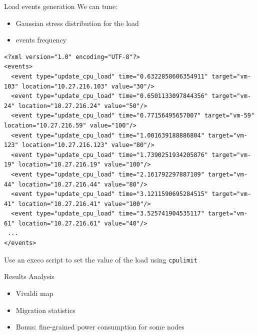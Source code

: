 \documentclass{beamer}
\begin{document}
\begin{frame}[fragile]{Load events generation}
We can tune:
\begin{itemize}
    \item Gaussian stress distribution for the load
    \item events frequency
\end{itemize}
\tiny
\begin{verbatim}
<?xml version="1.0" encoding="UTF-8"?>
<events>
  <event type="update_cpu_load" time="0.6322858606354911" target="vm-103" location="10.27.216.103" value="30"/>
  <event type="update_cpu_load" time="0.6501133097844356" target="vm-24" location="10.27.216.24" value="50"/>
  <event type="update_cpu_load" time="0.77156495657007" target="vm-59" location="10.27.216.59" value="100"/>
  <event type="update_cpu_load" time="1.001639188886804" target="vm-123" location="10.27.216.123" value="80"/>
  <event type="update_cpu_load" time="1.7390251934205876" target="vm-19" location="10.27.216.19" value="100"/>
  <event type="update_cpu_load" time="2.161792297887189" target="vm-44" location="10.27.216.44" value="80"/>
  <event type="update_cpu_load" time="3.1211590695284515" target="vm-41" location="10.27.216.41" value="100"/>
  <event type="update_cpu_load" time="3.525741904535117" target="vm-61" location="10.27.216.61" value="40"/>
 ...
</events>
\end{verbatim}
\begin{block}{}
\normalsize
Use an execo script to set the value of the load using \verb=cpulimit=
\end{block}
\end{frame}


\begin{frame}{Results Analysis}
\begin{itemize}
    \item Vivaldi map
    \item Migration statistics
    \item Bonus: fine-grained power consumption for some nodes
\end{itemize}
\end{frame}
\end{document}
